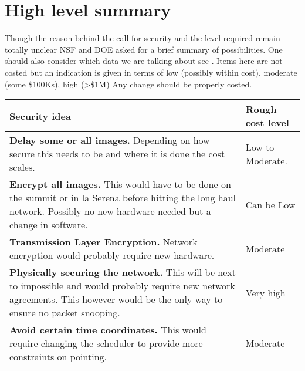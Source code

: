 \section{High level summary}\label{sec:sum}
Though the reason behind the call for security and the level required remain totally unclear
NSF and DOE asked for a brief summary of possibilities.
One should also consider which data we are talking about see .
Items here are not costed but an indication is given in terms of low (possibly within cost), moderate (some \$100Ks), high (>\$1M)
Any change should be properly costed.


\begin{longtable}{p{} p{}}\hline
\textbf{Security idea} & \textbf{Rough cost level}  \\\hline
 {\bf Delay some or all images.} Depending on how secure this needs to be and where it is done the cost scales.  & Low to Moderate.\\
{\bf Encrypt all images.} This would have to be done on the summit or in la Serena before hitting the long haul network. Possibly no new hardware needed but a change in software.  & Can be Low \\
{\bf Transmission Layer Encryption.} Network encryption would probably require new hardware. & Moderate \\
{\bf Physically securing the network.} This will be next to impossible and would probably require new network agreements. This however would be the only way to ensure no packet snooping. & Very high \\
{\bf Avoid certain time coordinates.} This would require changing the scheduler to provide more constraints on pointing. &  Moderate  \\\hline
\end{longtable}
